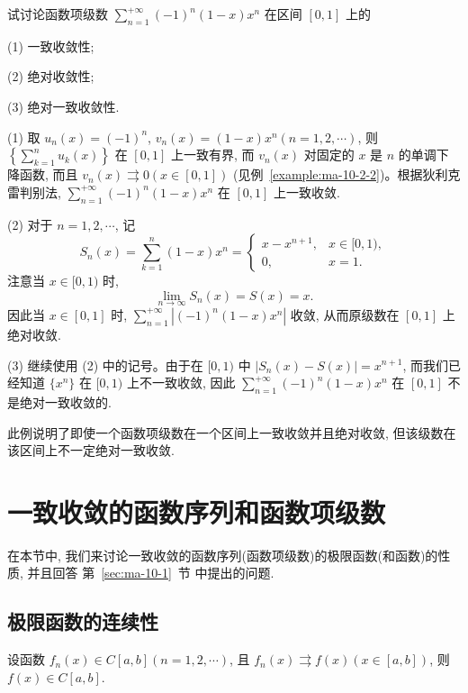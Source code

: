 \begin{example}\label{example:ma-10-3-8}
试讨论函数项级数 $\sum\limits_{n=1}^{+\infty}(-1)^n(1-x)x^n$ 在区间 $[0,1]$ 上的

(1) 一致收敛性;

(2) 绝对收敛性;

(3) 绝对一致收敛性.
\end{example}


\begin{solve}
(1) 取 $u_n(x)=(-1)^n$, $v_n(x)=(1-x)x^n(n=1,2,\cdots)$, 则 $\left\{\sum\limits_{k=1}^n u_k(x)\right\}$ 在 $[0,1]$ 上一致有界, 而 $v_n(x)$ 对固定的 $x$ 是 $n$ 的单调下降函数, 而且 $v_n(x)\rightrightarrows0(x\in[0,1])$ (见例~\ref{example:ma-10-2-2})。根据狄利克雷判别法, $\sum\limits_{n=1}^{+\infty}(-1)^n(1-x)x^n$ 在 $[0,1]$ 上一致收敛.

(2) 对于 $n=1,2,\cdots$, 记
\[
  S_n(x)=\sum_{k=1}^n(1-x)x^n=
  \begin{cases}
    x-x^{n+1}, & x\in[0,1),\\
    0, & x=1.
  \end{cases}
\]
注意当 $x\in[0,1)$ 时,
\[
  \lim_{n\to\infty}S_n(x)=S(x)=x.
\]
因此当 $x\in[0,1]$ 时, $\sum\limits_{n=1}^{+\infty}|(-1)^n(1-x)x^n|$ 收敛, 从而原级数在 $[0,1]$ 上绝对收敛.

(3) 继续使用 (2) 中的记号。由于在 $[0,1)$ 中 $|S_n(x)-S(x)|=x^{n+1}$, 而我们已经知道 $\{x^n\}$ 在 $[0,1)$ 上不一致收敛, 因此 $\sum\limits_{n=1}^{+\infty}(-1)^n(1-x)x^n$ 在 $[0,1]$ 不是绝对一致收敛的.

此例说明了即使一个函数项级数在一个区间上一致收敛并且绝对收敛, 但该级数在该区间上不一定绝对一致收敛.
\end{solve}


\section{一致收敛的函数序列和函数项级数}
\label{sec:ma-10-4}

在本节中, 我们来讨论一致收敛的函数序列(函数项级数)的极限函数(和函数)的性质, 并且回答 第~\ref{sec:ma-10-1}~节 中提出的问题.

\subsection{极限函数的连续性}
\label{subsec:ma-10-4-1}

\begin{theorem}\label{theorem:ma-10-4-1}
设函数 $f_n(x)\in C[a,b](n=1,2,\cdots)$, 且 $f_n(x)\rightrightarrows f(x)(x\in[a,b])$, 则 $f(x)\in C[a,b]$.
\end{theorem}


